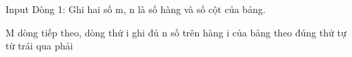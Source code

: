 Input
Dòng 1: Ghi hai số m, n là số hàng và số cột của bảng.  

   M dòng tiếp theo, dòng thứ i ghi đủ n số trên hàng i của bảng theo đúng thứ tự từ trái qua phải